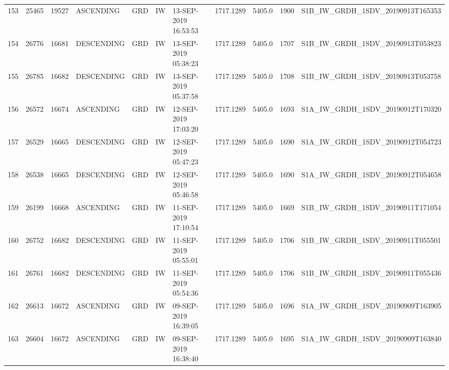 \begin{tabular}{lrrllllllll}
153 &  25465 &   19527 &   ASCENDING &          GRD &              IW &  13-SEP-2019 16:53:53 &                  1717.1289 &          5405.0 &       1900 &  S1B\_IW\_GRDH\_1SDV\_20190913T165353 \\
154 &  26776 &   16681 &  DESCENDING &          GRD &              IW &  13-SEP-2019 05:38:23 &                  1717.1289 &          5405.0 &       1707 &  S1B\_IW\_GRDH\_1SDV\_20190913T053823 \\
155 &  26785 &   16682 &  DESCENDING &          GRD &              IW &  13-SEP-2019 05:37:58 &                  1717.1289 &          5405.0 &       1708 &  S1B\_IW\_GRDH\_1SDV\_20190913T053758 \\
156 &  26572 &   16674 &   ASCENDING &          GRD &              IW &  12-SEP-2019 17:03:20 &                  1717.1289 &          5405.0 &       1693 &  S1A\_IW\_GRDH\_1SDV\_20190912T170320 \\
157 &  26529 &   16665 &  DESCENDING &          GRD &              IW &  12-SEP-2019 05:47:23 &                  1717.1289 &          5405.0 &       1690 &  S1A\_IW\_GRDH\_1SDV\_20190912T054723 \\
158 &  26538 &   16665 &  DESCENDING &          GRD &              IW &  12-SEP-2019 05:46:58 &                  1717.1289 &          5405.0 &       1690 &  S1A\_IW\_GRDH\_1SDV\_20190912T054658 \\
159 &  26199 &   16668 &   ASCENDING &          GRD &              IW &  11-SEP-2019 17:10:54 &                  1717.1289 &          5405.0 &       1669 &  S1B\_IW\_GRDH\_1SDV\_20190911T171054 \\
160 &  26752 &   16682 &  DESCENDING &          GRD &              IW &  11-SEP-2019 05:55:01 &                  1717.1289 &          5405.0 &       1706 &  S1B\_IW\_GRDH\_1SDV\_20190911T055501 \\
161 &  26761 &   16682 &  DESCENDING &          GRD &              IW &  11-SEP-2019 05:54:36 &                  1717.1289 &          5405.0 &       1706 &  S1B\_IW\_GRDH\_1SDV\_20190911T055436 \\
162 &  26613 &   16672 &   ASCENDING &          GRD &              IW &  09-SEP-2019 16:39:05 &                  1717.1289 &          5405.0 &       1696 &  S1A\_IW\_GRDH\_1SDV\_20190909T163905 \\
163 &  26604 &   16672 &   ASCENDING &          GRD &              IW &  09-SEP-2019 16:38:40 &                  1717.1289 &          5405.0 &       1695 &  S1A\_IW\_GRDH\_1SDV\_20190909T163840 \\

\end{tabular}
